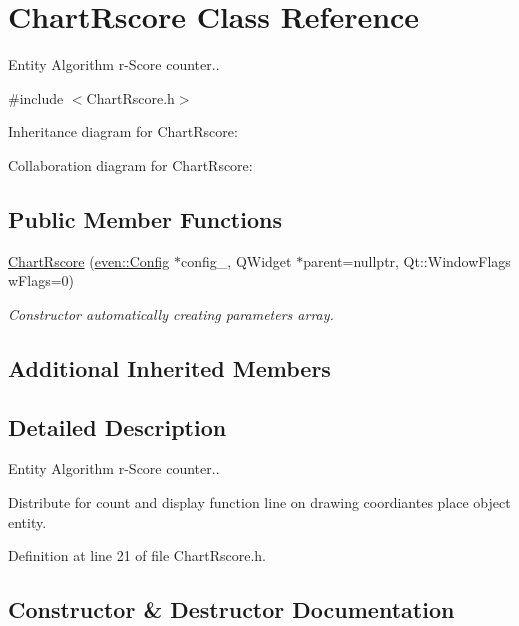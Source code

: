 \hypertarget{class_chart_rscore}{}\section{Chart\+Rscore Class Reference}
\label{class_chart_rscore}


Entity Algorithm r-\/\+Score counter..  




{\ttfamily \#include $<$Chart\+Rscore.\+h$>$}



Inheritance diagram for Chart\+Rscore\+:


Collaboration diagram for Chart\+Rscore\+:
\subsection*{Public Member Functions}
\begin{DoxyCompactItemize}
\item 
\mbox{\hyperlink{class_chart_rscore_afc69287489d4b7ffa34e60abab50ca2e}{Chart\+Rscore}} (\mbox{\hyperlink{classeven_1_1_config}{even\+::\+Config}} $\ast$config\+\_\+, Q\+Widget $\ast$parent=nullptr, Qt\+::\+Window\+Flags w\+Flags=0)
\begin{DoxyCompactList}\small\item\em Constructor automatically creating parameters array. \end{DoxyCompactList}\end{DoxyCompactItemize}
\subsection*{Additional Inherited Members}


\subsection{Detailed Description}
Entity Algorithm r-\/\+Score counter.. 

Distribute for count and display function line on drawing coordiantes place object entity. 

Definition at line 21 of file Chart\+Rscore.\+h.



\subsection{Constructor \& Destructor Documentation}
\mbox{\label{class_chart_rscore_afc69287489d4b7ffa34e60abab50ca2e}} 
